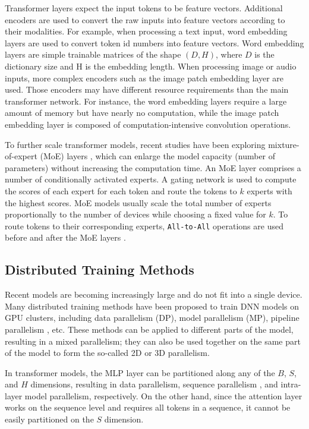 \documentclass[a4paper, 11pt]{article}
\begin{document}
    Transformer layers expect the input tokens to be feature vectors. Additional encoders are used to convert the raw
    inputs into feature vectors according to their modalities. For example, when processing a text input, word embedding
    layers are used to convert token id numbers into feature vectors. Word embedding layers are simple trainable matrices of
    the shape $(D, H)$, where $D$ is the dictionary size and H is the embedding length. When processing image or audio
    inputs, more complex encoders such as the image patch embedding layer \cite{vit} are used. Those encoders may have
    different resource requirements than the main transformer network. For instance, the word embedding layers require a
    large amount of memory but have nearly no computation, while the image patch embedding layer is composed of
    computation-intensive convolution operations.

    To further scale transformer models, recent studies have been exploring mixture-of-expert (MoE) layers
    \cite{gshard,gspmd,palme,switchtransformer,m6}, which can enlarge the model capacity (number of parameters) without
    increasing the computation time. An MoE layer comprises a number of conditionally activated experts. A gating
    network is used to compute the scores of each expert for each token and route the tokens to $k$ experts with the
    highest scores. MoE models usually scale the total number of experts proportionally to the number of devices while
    choosing a fixed value for $k$. To route tokens to their corresponding experts, \texttt{All-to-All} operations are
    used before and after the MoE layers \cite{gshard}.

    \subsection{Distributed Training Methods}

    Recent models are becoming increasingly large and do not fit into a single device. Many distributed training methods
    have been proposed to train DNN models on GPU clusters, including data parallelism (DP), model parallelism (MP),
    pipeline parallelism \cite{pipedream,gpipe}, etc. These methods can be applied to different parts of the model,
    resulting in a mixed parallelism; they can also be used together on the same part of the model to form the so-called 2D
    or 3D parallelism.

    In transformer models, the MLP layer can be partitioned along any of the $B$, $S$, and $H$ dimensions, resulting in
    data parallelism, sequence parallelism \cite{colossalai, megatron3}, and intra-layer model parallelism,
    respectively. On the other hand, since the attention layer works on the sequence level and requires all tokens in a
    sequence, it cannot be easily partitioned on the $S$ dimension.
\end{document}
